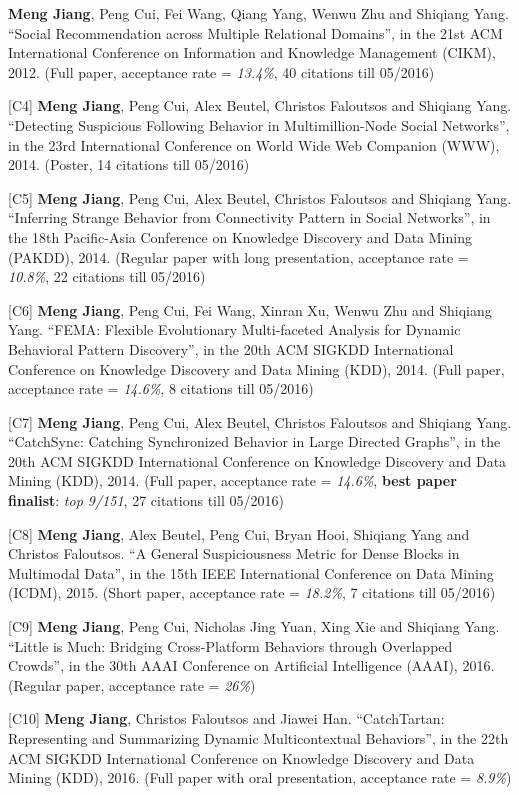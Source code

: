 \documentclass[margin, 10pt]{res} %
\begin{document}
\begin{resume}
[C3] {\bf Meng Jiang}, Peng Cui, Fei Wang, Qiang Yang, Wenwu Zhu and Shiqiang Yang. ``Social Recommendation across Multiple Relational Domains'', in the 21st ACM International Conference on Information and Knowledge Management (CIKM), 2012. (Full paper, acceptance rate = {\em 13.4\%}, 40 citations till 05/2016)

[C4] {\bf Meng Jiang}, Peng Cui, Alex Beutel, Christos Faloutsos and Shiqiang Yang. ``Detecting Suspicious Following Behavior in Multimillion-Node Social Networks'', in the 23rd International Conference on World Wide Web Companion (WWW), 2014. (Poster, 14 citations till 05/2016)

[C5] {\bf Meng Jiang}, Peng Cui, Alex Beutel, Christos Faloutsos and Shiqiang Yang. ``Inferring Strange Behavior from Connectivity Pattern in Social Networks'', in the 18th Pacific-Asia Conference on Knowledge Discovery and Data Mining (PAKDD), 2014. (Regular paper with long presentation, acceptance rate = {\em 10.8\%}, 22 citations till 05/2016)

[C6] {\bf Meng Jiang}, Peng Cui, Fei Wang, Xinran Xu, Wenwu Zhu and Shiqiang Yang. ``FEMA: Flexible Evolutionary Multi-faceted Analysis for Dynamic Behavioral Pattern Discovery'', in the 20th ACM SIGKDD International Conference on Knowledge Discovery and Data Mining (KDD), 2014. (Full paper, acceptance rate = {\em 14.6\%}, 8 citations till 05/2016)

[C7] {\bf Meng Jiang}, Peng Cui, Alex Beutel, Christos Faloutsos and Shiqiang Yang. ``CatchSync: Catching Synchronized Behavior in Large Directed Graphs'', in the 20th ACM SIGKDD International Conference on Knowledge Discovery and Data Mining (KDD), 2014. (Full paper, acceptance rate = {\em 14.6\%}, {\bf best paper finalist}: {\em top 9/151}, 27 citations till 05/2016)

[C8] {\bf Meng Jiang}, Alex Beutel, Peng Cui, Bryan Hooi, Shiqiang Yang and Christos Faloutsos. ``A General Suspiciousness Metric for Dense Blocks in Multimodal Data'', in the 15th IEEE International Conference on Data Mining (ICDM), 2015. (Short paper, acceptance rate = {\em 18.2\%}, 7 citations till 05/2016)

[C9] {\bf Meng Jiang}, Peng Cui, Nicholas Jing Yuan, Xing Xie and Shiqiang Yang. ``Little is Much: Bridging Cross-Platform Behaviors through Overlapped Crowds'', in the 30th AAAI Conference on Artificial Intelligence (AAAI), 2016. (Regular paper, acceptance rate = {\em 26\%})

[C10] {\bf Meng Jiang}, Christos Faloutsos and Jiawei Han. ``CatchTartan: Representing and Summarizing Dynamic Multicontextual Behaviors'', in the 22th ACM SIGKDD International Conference on Knowledge Discovery and Data Mining (KDD), 2016. (Full paper with oral presentation, acceptance rate = {\em 8.9\%})


\end{resume}
\end{document}
